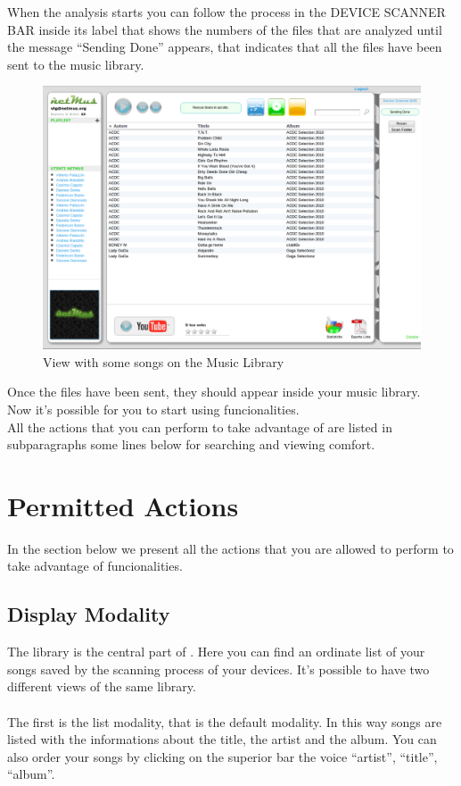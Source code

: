 When the analysis starts you can follow the process in the DEVICE SCANNER BAR
inside its label that shows the numbers of the files that are analyzed until
the message ``Sending Done'' appears, that indicates that all the files have
been sent to the music library.\\

\begin{figure}[htbp]
  \centering
  \includegraphics[width=15cm]{img/MU/song_loaded.png}
\caption{View with some songs on the Music Library}
\end{figure}

Once the files have been sent, they should appear inside your music library.\\
Now it's possible for you to start using  funcionalities.\\
All the actions that you can perform to take advantage of  are listed
in subparagraphs some lines below for searching and viewing comfort.


\section{Permitted Actions}
In the section below we present all the actions that you are allowed to perform
to take advantage of  funcionalities.

\subsection{Display Modality}

The library is the central part of . Here you can find an ordinate
list of your songs saved by the scanning process of your devices. It's possible
to have two different views of the same library.\\
\\
The first is the list modality, that is the default modality. In this
way songs are listed with the informations about the title, the artist and the
album. You can also order your songs by clicking on the superior bar the voice
``artist'', ``title'', ``album''.\\


